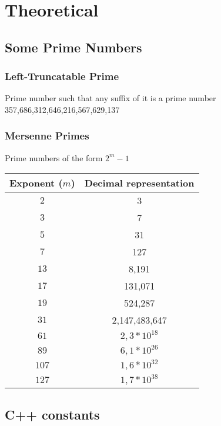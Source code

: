 \documentclass[11pt, a4paper, oneside]{book}
\begin{document}
\hfill

\chapter{Theoretical}

\twocolumn

\section{Some Prime Numbers}

\subsection{Left-Truncatable Prime}
\large{Prime number such that any suffix of it is a prime number} \\
\Large{357,686,312,646,216,567,629,137}

\subsection{Mersenne Primes}
\large{Prime numbers of the form $2^m-1$}
\begin{table}[h]
  \centering
  \begin{tabular}{|c|c|}
    \hline
    \textbf{Exponent ($m$)} & \textbf{Decimal representation} \\
    \hline
    \(2\) & 3 \\
    \hline
    \(3\) & 7 \\
    \hline
    \(5\) & 31 \\
    \hline
    \(7\) & 127 \\
    \hline
    \(13\) & 8,191 \\
    \hline
    \(17\) & 131,071 \\
    \hline
    \(19\) & 524,287 \\
    \hline
    \(31\) & 2,147,483,647 \\
    \hline
    \(61\) & $2,3 * 10^{18}$ \\
    \hline
    \(89\) & $6,1 * 10^{26}$ \\
    \hline
    \(107\) & $1,6 * 10^{32}$ \\
    \hline
    \(127\) & $1,7 * 10^{38}$ \\
    \hline
  \end{tabular}
\end{table}

\section{C++ constants}
\end{document}
